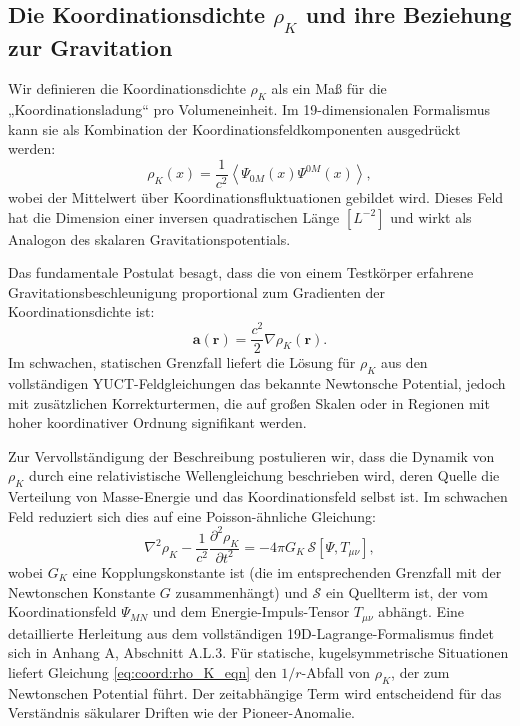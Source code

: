 \documentclass[12pt,a4paper]{article}
\theoremstyle{remark}
\begin{document}
	\subsection{Die Koordinationsdichte $\rho_K$ und ihre Beziehung zur Gravitation}
	\label{subsec:rho_K_definition}
	
	Wir definieren die Koordinationsdichte $\rho_K$ als ein Maß für die „Koordinationsladung“ pro Volumeneinheit. Im 19-dimensionalen Formalismus kann sie als Kombination der Koordinationsfeldkomponenten ausgedrückt werden:
	\begin{equation}
		\rho_K(x) = \frac{1}{c^2} \left\langle \Psi_{0M}(x) \Psi^{0M}(x) \right\rangle,
		\label{eq:coord:rho_K_def}
	\end{equation}
	wobei der Mittelwert über Koordinationsfluktuationen gebildet wird. Dieses Feld hat die Dimension einer inversen quadratischen Länge $[L^{-2}]$ und wirkt als Analogon des skalaren Gravitationspotentials.
	
	Das fundamentale Postulat besagt, dass die von einem Testkörper erfahrene Gravitationsbeschleunigung proportional zum Gradienten der Koordinationsdichte ist:
	\begin{equation}
		\mathbf{a}(\mathbf{r}) = \frac{c^2}{2} \nabla \rho_K(\mathbf{r}).
		\label{eq:coord:grav_from_rho}
	\end{equation}
	Im schwachen, statischen Grenzfall liefert die Lösung für $\rho_K$ aus den vollständigen YUCT-Feldgleichungen das bekannte Newtonsche Potential, jedoch mit zusätzlichen Korrekturtermen, die auf großen Skalen oder in Regionen mit hoher koordinativer Ordnung signifikant werden.
	
	Zur Vervollständigung der Beschreibung postulieren wir, dass die Dynamik von $\rho_K$ durch eine relativistische Wellengleichung beschrieben wird, deren Quelle die Verteilung von Masse-Energie und das Koordinationsfeld selbst ist. Im schwachen Feld reduziert sich dies auf eine Poisson-ähnliche Gleichung:
	\begin{equation}
		\nabla^2 \rho_K - \frac{1}{c^2}\frac{\partial^2 \rho_K}{\partial t^2} = -4\pi G_K \, \mathcal{S}[\Psi, T_{\mu\nu}],
		\label{eq:coord:rho_K_eqn}
	\end{equation}
	wobei $G_K$ eine Kopplungskonstante ist (die im entsprechenden Grenzfall mit der Newtonschen Konstante $G$ zusammenhängt) und $\mathcal{S}$ ein Quellterm ist, der vom Koordinationsfeld $\Psi_{MN}$ und dem Energie-Impuls-Tensor $T_{\mu\nu}$ abhängt. Eine detaillierte Herleitung aus dem vollständigen 19D-Lagrange-Formalismus findet sich in Anhang A, Abschnitt A.L.3. Für statische, kugelsymmetrische Situationen liefert Gleichung \eqref{eq:coord:rho_K_eqn} den $1/r$-Abfall von $\rho_K$, der zum Newtonschen Potential führt. Der zeitabhängige Term wird entscheidend für das Verständnis säkularer Driften wie der Pioneer-Anomalie.
	
\end{document}
